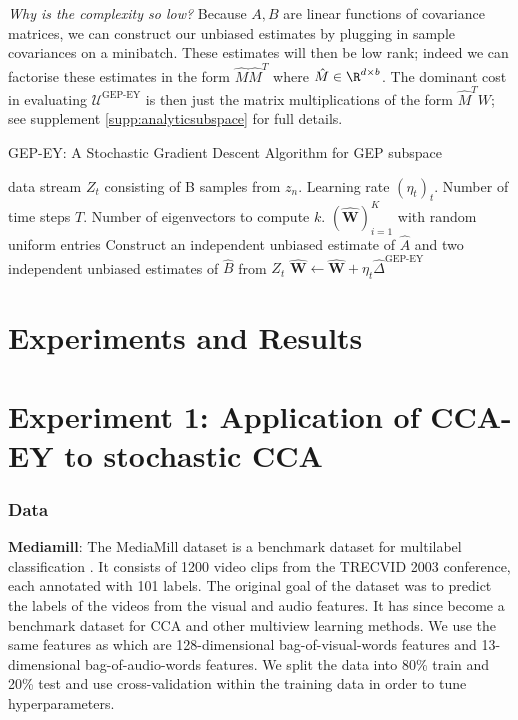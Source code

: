 \textit{Why is the complexity so low?} Because $A,B$ are linear functions of covariance matrices, we can construct our unbiased estimates by plugging in sample covariances on a minibatch.
These estimates will then be low rank; indeed we can factorise these estimates in the form $\hat{M} \hat{M}^T$ where $\hat{M} \in \R^{d \times b}$. The dominant cost in evaluating $\mathcal{U}^\text{GEP-EY}$ is then just the matrix multiplications of the form $\hat{M}^T W$; see supplement \ref{supp:analyticsubspace} for full details.

\begin{algorithm}
    \caption{GEP-EY: A Stochastic Gradient Descent Algorithm for GEP subspace}
    \label{alg:Delta}
    \begin{algorithmic}
         data stream $Z_t$ consisting of B samples from $z_n$. Learning rate $(\eta_t)_t$. Number of time steps $T$. Number of eigenvectors to compute $k$.
         $(\hat{\mathbf {W}})_{i=1}^K$ with random uniform entries
        \STATE Construct an independent unbiased estimate of $\hat{A}$ and two independent unbiased estimates of $\hat{B}$ from $Z_t$
        \STATE $\hat{\mathbf {W}} \leftarrow \hat{\mathbf {W}}+\eta_{t} \hat{\Delta}^{\text{GEP-EY}}$
        \ENDFOR
    \end{algorithmic}
\end{algorithm}

\section{Experiments and Results}

\section{Experiment 1: Application of CCA-EY to stochastic CCA}

\subsubsection{Data}
\textbf{Mediamill}: The MediaMill dataset \cite{feng2004context} is a benchmark dataset for multilabel classification
. It consists
of 1200 video clips from the TRECVID 2003 conference, each annotated with 101 labels. The original goal of the dataset was to predict the labels of the videos from the visual and audio features. It has since become a benchmark dataset for CCA and other multiview learning methods. We use the same features as \cite{gemp2022generalized} which are 128-dimensional bag-of-visual-words features and 13-dimensional bag-of-audio-words features. We split the data into 80\% train and 20\% test and use cross-validation within the training data in order to tune hyperparameters.

